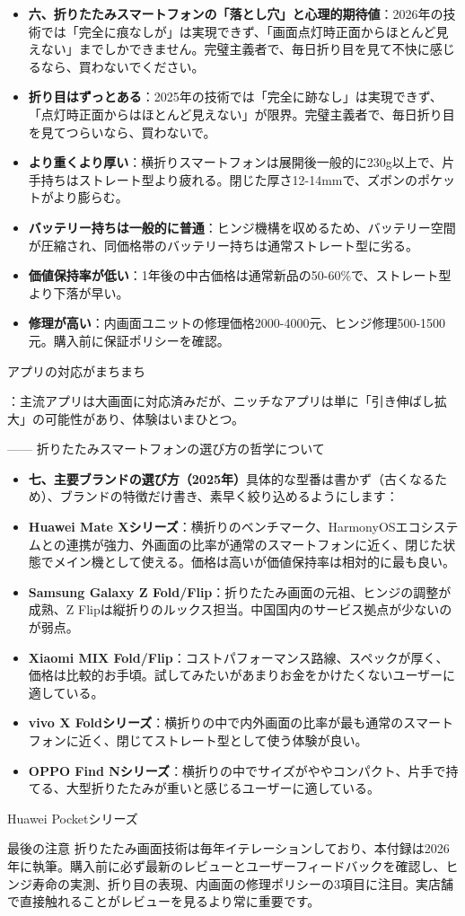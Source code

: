 \begin{itemize}
  \item \textbf{六、折りたたみスマートフォンの「落とし穴」と心理的期待値}：2026年の技術では「完全に痕なしが」は実現できず、「画面点灯時正面からほとんど見えない」までしかできません。完璧主義者で、毎日折り目を見て不快に感じるなら、買わないでください。
  \item \textbf{折り目はずっとある}：2025年の技術では「完全に跡なし」は実現できず、「点灯時正面からはほとんど見えない」が限界。完璧主義者で、毎日折り目を見てつらいなら、買わないで。
  \item \textbf{より重くより厚い}：横折りスマートフォンは展開後一般的に230g以上で、片手持ちはストレート型より疲れる。閉じた厚さ12-14mmで、ズボンのポケットがより膨らむ。
  \item \textbf{バッテリー持ちは一般的に普通}：ヒンジ機構を収めるため、バッテリー空間が圧縮され、同価格帯のバッテリー持ちは通常ストレート型に劣る。
  \item \textbf{価値保持率が低い}：1年後の中古価格は通常新品の50-60\%で、ストレート型より下落が早い。
  \item \textbf{修理が高い}：内画面ユニットの修理価格2000-4000元、ヒンジ修理500-1500元。購入前に保証ポリシーを確認。
\end{itemize}

アプリの対応がまちまち

：主流アプリは大画面に対応済みだが、ニッチなアプリは単に「引き伸ばし拡大」の可能性があり、体験はいまひとつ。


—— 折りたたみスマートフォンの選び方の哲学について

\begin{itemize}
  \item \textbf{七、主要ブランドの選び方（2025年）}具体的な型番は書かず（古くなるため）、ブランドの特徴だけ書き、素早く絞り込めるようにします：
  \item \textbf{Huawei Mate Xシリーズ}：横折りのベンチマーク、HarmonyOSエコシステムとの連携が強力、外画面の比率が通常のスマートフォンに近く、閉じた状態でメイン機として使える。価格は高いが価値保持率は相対的に最も良い。
  \item \textbf{Samsung Galaxy Z Fold/Flip}：折りたたみ画面の元祖、ヒンジの調整が成熟、Z Flipは縦折りのルックス担当。中国国内のサービス拠点が少ないのが弱点。
  \item \textbf{Xiaomi MIX Fold/Flip}：コストパフォーマンス路線、スペックが厚く、価格は比較的お手頃。試してみたいがあまりお金をかけたくないユーザーに適している。
  \item \textbf{vivo X Foldシリーズ}：横折りの中で内外画面の比率が最も通常のスマートフォンに近く、閉じてストレート型として使う体験が良い。
  \item \textbf{OPPO Find Nシリーズ}：横折りの中でサイズがややコンパクト、片手で持てる、大型折りたたみが重いと感じるユーザーに適している。
\end{itemize}

Huawei Pocketシリーズ

\begin{tcbinfo}{最後の注意}
折りたたみ画面技術は毎年イテレーションしており、本付録は2026年に執筆。購入前に必ず最新のレビューとユーザーフィードバックを確認し、ヒンジ寿命の実測、折り目の表現、内画面の修理ポリシーの3項目に注目。実店舗で直接触れることがレビューを見るより常に重要です。

\end{tcbinfo}
